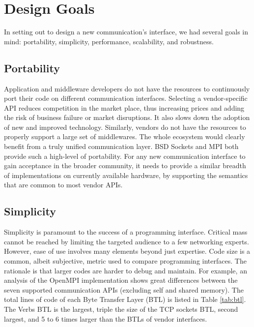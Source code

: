 \section{Design Goals}
\label{sec:design}

In setting out to design a new communication's interface, we had several goals 
in mind: portability, simplicity, performance, scalability, and robustness.

\subsection{Portability}
Application and middleware developers do not have the resources to continuously 
port their code on different communication interfaces. 
Selecting a vendor-specific API reduces competition in the market place, thus 
increasing prices and adding the risk of business failure or market disruptions. It 
also slows down the adoption of new and improved technology. 
Similarly, vendors do not have the resources to properly support a large set 
of middlewares. The whole ecosystem would clearly benefit from a truly unified 
communication layer. 
BSD Sockets and MPI both provide such a high-level of portability. 
For any new communication interface to gain acceptance in the broader 
community, it needs to provide a similar breadth of implementations on 
currently available hardware, by supporting the semantics that are common 
to most vendor APIs.

\subsection{Simplicity}
Simplicity is paramount to the success of a programming interface. Critical 
mass cannot be reached by limiting the targeted audience to a few networking 
experts. However, ease of use involves many elements beyond just expertise. 
Code size is a common, albeit subjective, metric used to compare programming 
interfaces. The rationale is that larger codes are harder to debug and 
maintain. For example, an analysis of the OpenMPI implementation shows great 
differences between the seven supported communication APIs (excluding self and 
shared memory). The total lines of code of each Byte Transfer Layer (BTL) is 
listed in Table \ref{tab:btl}. The Verbs BTL is the largest, triple the size 
of the TCP sockets BTL, second largest, and 5 to 6 times larger than the BTLs of 
vendor interfaces. 

